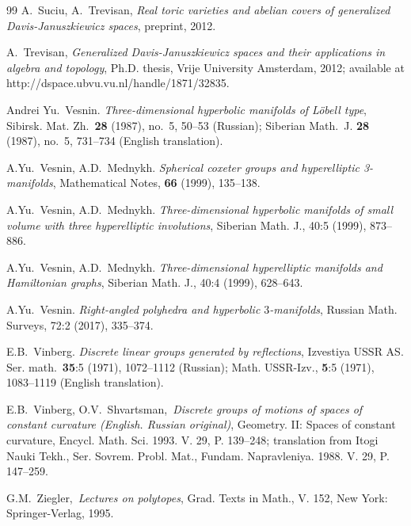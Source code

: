 \documentclass[12pt]{amsart}
\theoremstyle{definition}
\theoremstyle{remark}
\begin{document}
\begin{thebibliography}{99}
A.~Suciu, A.~Trevisan, 
\emph{Real toric varieties and abelian covers of generalized Davis-Januszkiewicz spaces}, 
preprint, 2012.

A.~Trevisan, 
\emph{Generalized Davis-Januszkiewicz spaces and their applications in algebra and topology},
Ph.D. thesis, Vrije University Amsterdam, 2012; available at
http://dspace.ubvu.vu.nl/handle/1871/32835.


Andrei Yu.~Vesnin.  
\emph{Three-dimensional hyperbolic manifolds of L\"obell type},
Sibirsk. Mat. Zh.~{\bf 28} (1987), no.~5, 50--53 (Russian); 
Siberian Math.~J. {\bf 28} (1987), no.~5, 731--734 (English translation).

A.Yu.~Vesnin, A.D.~Mednykh.
\emph{Spherical coxeter groups and hyperelliptic 3-manifolds},
Mathematical Notes, {\bf 66} (1999), 135--138. 

A.Yu.~Vesnin, A.D.~Mednykh.
\emph{Three-dimensional hyperbolic manifolds of small volume with three hyperelliptic involutions},
Siberian Math. J., 40:5 (1999), 873--886.

A.Yu.~Vesnin, A.D.~Mednykh.
\emph{Three-dimensional hyperelliptic manifolds and Hamiltonian graphs}, 
Siberian Math. J., 40:4 (1999), 628--643.

A.Yu.~Vesnin.
\emph{Right-angled polyhedra and hyperbolic $3$-manifolds},
Russian Math. Surveys, 72:2 (2017), 335--374.

E.B.~Vinberg.
\emph{Discrete linear groups generated by reflections},
Izvestiya USSR AS. Ser. math.~{\bf35}:5 (1971), 1072--1112 (Russian); 
Math. USSR-Izv., {\bf 5}:5 (1971), 1083--1119 (English translation).

E.B.~Vinberg, O.V.~Shvartsman,\,
\emph{Discrete groups of motions of spaces of constant curvature (English. Russian original)},
Geometry. II: Spaces of constant curvature, Encycl. Math. Sci. 1993. V. 29, P. 139--248; translation from Itogi Nauki Tekh., Ser. Sovrem. Probl. Mat., Fundam. Napravleniya. 1988. V. 29, P. 147--259.


G.M.~Ziegler,\,
\emph{Lectures on polytopes},
Grad. Texts in Math., V. 152, New York: Springer-Verlag, 1995.


\end{thebibliography}
\end{document}
